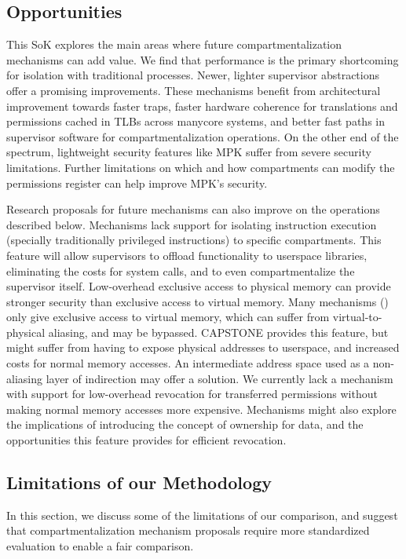 \subsection{Opportunities}
\label{sec:compsok:opportunities}
This SoK explores the main areas where future compartmentalization
mechanisms can add value.
We find that performance is the primary shortcoming for isolation with 
traditional processes.
Newer, lighter supervisor abstractions~\cite{LittonVE0BD16, ChenRSL16}
offer a promising improvements.
These mechanisms benefit from architectural improvement towards faster traps,
faster hardware coherence for translations and permissions cached in TLBs across 
manycore systems, and better fast paths in supervisor software for 
compartmentalization operations.
On the other end of the spectrum, lightweight security features like MPK suffer
from severe security limitations. 
Further limitations on which and how compartments can modify the permissions
register can help improve MPK's security.

Research proposals for future mechanisms can also improve on the operations
described below.
Mechanisms lack support for isolating instruction execution (specially 
traditionally privileged instructions) to specific compartments.
This feature will allow supervisors to offload functionality to userspace libraries,
eliminating the costs for system calls, and to even compartmentalize the
supervisor itself.
Low-overhead exclusive access to physical memory can provide stronger security
than exclusive access to virtual memory.
Many mechanisms (\seccells) only give exclusive access to virtual memory,
which can suffer from virtual-to-physical aliasing, and may be bypassed.
CAPSTONE provides this feature, but might suffer from having to expose 
physical addresses to userspace, and increased costs for normal memory
accesses.
An intermediate address space used as a non-aliasing layer of indirection
may offer a solution.
We currently lack a mechanism with support for low-overhead revocation for
transferred permissions without making normal memory accesses more expensive.
Mechanisms might also explore the implications of introducing the concept of
ownership for data, and the opportunities this feature provides for
efficient revocation.

\subsection{Limitations of our Methodology}
\label{sec:compsok:limitations}
In this section, we discuss some of the limitations of our comparison, and
suggest that compartmentalization mechanism proposals require more 
standardized evaluation to enable a fair comparison.

